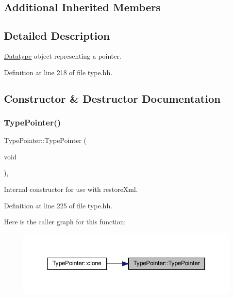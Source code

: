 \subsection*{Additional Inherited Members}


\subsection{Detailed Description}
\mbox{\hyperlink{class_datatype}{Datatype}} object representing a pointer. 

Definition at line 218 of file type.\+hh.



\subsection{Constructor \& Destructor Documentation}
\mbox{\label{class_type_pointer_aa70c8251d0da1b243d248951366c06c7}} 
\subsubsection{\texorpdfstring{TypePointer()}{TypePointer()}\hspace{0.1cm}{\footnotesize\ttfamily [1/3]}}
{\footnotesize\ttfamily Type\+Pointer\+::\+Type\+Pointer (\begin{DoxyParamCaption}\item[{void}]{ }\end{DoxyParamCaption})\hspace{0.3cm}{\ttfamily [inline]}, {\ttfamily [protected]}}



Internal constructor for use with restore\+Xml. 



Definition at line 225 of file type.\+hh.

Here is the caller graph for this function\+:
\nopagebreak
\begin{figure}[H]
\begin{center}
\leavevmode
\includegraphics[width=340pt]{class_type_pointer_aa70c8251d0da1b243d248951366c06c7_icgraph}
\end{center}
\end{figure}
\mbox{\label{class_type_pointer_a900b24dbd7c0f62e6588312e9c7e3bc6}} 
